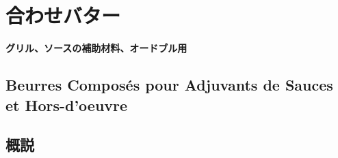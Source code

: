 \hypertarget{beurres-composes}{%
\section{合わせバター}\label{beurres-composes}}

\vspace{0\zw}
\begin{center}
\textbf{グリル、ソースの補助材料、オードブル用}
\end{center}
\vspace*{-2\zw}

\hypertarget{beurres-composes-pour-adjuvants-de-sauces}{%
\subsection{Beurres Composés pour Adjuvants de Sauces et
Hors-d'oeuvre}\label{beurres-composes-pour-adjuvants-de-sauces}}

 

\hypertarget{observation-sur-les-beurres-composes}{%
\subsection{概説}\label{observation-sur-les-beurres-composes}}

